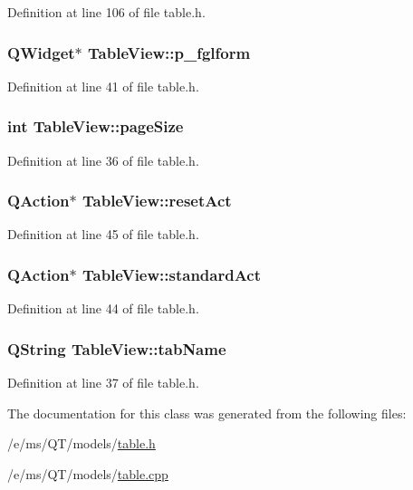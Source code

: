 Definition at line 106 of file table.h.

\hypertarget{classTableView_a1d048152ea82f3f8d33e538cb032b37b}{
\subsubsection[{p\_\-fglform}]{\setlength{\rightskip}{0pt plus 5cm}QWidget$\ast$ {\bf TableView::p\_\-fglform}}}
\label{classTableView_a1d048152ea82f3f8d33e538cb032b37b}


Definition at line 41 of file table.h.

\hypertarget{classTableView_abb4a46ca1492e88b8fe2fa9b68595340}{
\subsubsection[{pageSize}]{\setlength{\rightskip}{0pt plus 5cm}int {\bf TableView::pageSize}}}
\label{classTableView_abb4a46ca1492e88b8fe2fa9b68595340}


Definition at line 36 of file table.h.

\hypertarget{classTableView_a513618ab0a9e4a3048ab617b68ba4409}{
\subsubsection[{resetAct}]{\setlength{\rightskip}{0pt plus 5cm}QAction$\ast$ {\bf TableView::resetAct}}}
\label{classTableView_a513618ab0a9e4a3048ab617b68ba4409}


Definition at line 45 of file table.h.

\hypertarget{classTableView_a24e6725afbdbe0fded4ee3409fc877a7}{
\subsubsection[{standardAct}]{\setlength{\rightskip}{0pt plus 5cm}QAction$\ast$ {\bf TableView::standardAct}}}
\label{classTableView_a24e6725afbdbe0fded4ee3409fc877a7}


Definition at line 44 of file table.h.

\hypertarget{classTableView_aa26e19998b21b401d0f7b4c703a7c91d}{
\subsubsection[{tabName}]{\setlength{\rightskip}{0pt plus 5cm}QString {\bf TableView::tabName}}}
\label{classTableView_aa26e19998b21b401d0f7b4c703a7c91d}


Definition at line 37 of file table.h.



The documentation for this class was generated from the following files:\begin{DoxyCompactItemize}
\item 
/e/ms/QT/models/\hyperlink{table_8h}{table.h}\item 
/e/ms/QT/models/\hyperlink{table_8cpp}{table.cpp}\end{DoxyCompactItemize}
